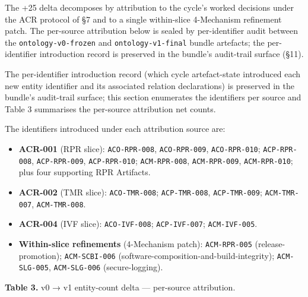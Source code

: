 \documentclass[
]{article}
\providecommand{\tightlist}{%
  \setlength{\itemsep}{0pt}\setlength{\parskip}{0pt}}
\begin{document}
The +25 delta decomposes by attribution to the cycle's worked decisions
under the ACR protocol of §7 and to a single within-slice 4-Mechanism
refinement patch. The per-source attribution below is sealed by
per-identifier audit between the \texttt{ontology-v0-frozen} and
\texttt{ontology-v1-final} bundle artefacts; the per-identifier
introduction record is preserved in the bundle's audit-trail surface
(§11).

The per-identifier introduction record (which cycle artefact-state
introduced each new entity identifier and its associated relation
declarations) is preserved in the bundle's audit-trail surface; this
section enumerates the identifiers per source and Table 3 summarises the
per-source attribution net counts.

The identifiers introduced under each attribution source are:

\begin{itemize}
\tightlist
\item
  \textbf{ACR-001} (RPR slice): \texttt{ACO-RPR-008},
  \texttt{ACO-RPR-009}, \texttt{ACO-RPR-010}; \texttt{ACP-RPR-008},
  \texttt{ACP-RPR-009}, \texttt{ACP-RPR-010}; \texttt{ACM-RPR-008},
  \texttt{ACM-RPR-009}, \texttt{ACM-RPR-010}; plus four supporting RPR
  Artifacts.
\item
  \textbf{ACR-002} (TMR slice): \texttt{ACO-TMR-008};
  \texttt{ACP-TMR-008}, \texttt{ACP-TMR-009}; \texttt{ACM-TMR-007},
  \texttt{ACM-TMR-008}.
\item
  \textbf{ACR-004} (IVF slice): \texttt{ACO-IVF-008};
  \texttt{ACP-IVF-007}; \texttt{ACM-IVF-005}.
\item
  \textbf{Within-slice refinements} (4-Mechanism patch):
  \texttt{ACM-RPR-005} (release-promotion); \texttt{ACM-SCBI-006}
  (software-composition-and-build-integrity); \texttt{ACM-SLG-005},
  \texttt{ACM-SLG-006} (secure-logging).
\end{itemize}

\textbf{Table 3.} v0 → v1 entity-count delta --- per-source attribution.
\end{document}
